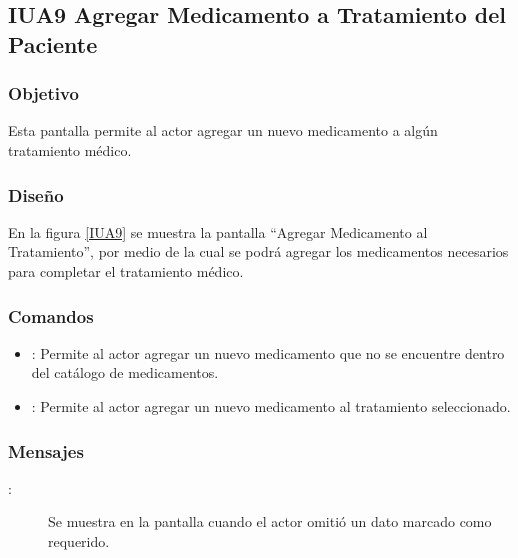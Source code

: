 \subsection{IUA9 Agregar Medicamento a Tratamiento del Paciente}
 
\subsubsection{Objetivo}

    Esta pantalla permite al actor agregar un nuevo medicamento a algún tratamiento médico.

\subsubsection{Diseño}

    En la figura \ref{IUA9} se muestra la pantalla ``Agregar Medicamento al Tratamiento'', por medio de la cual se podrá agregar los medicamentos necesarios para completar el tratamiento médico. \\


\subsubsection{Comandos}
\begin{itemize}
    \item {}: Permite al actor agregar un nuevo medicamento que no se encuentre dentro del catálogo de medicamentos.
    \item {}: Permite al actor agregar un nuevo medicamento al tratamiento seleccionado.
\end{itemize}

\subsubsection{Mensajes}

\begin{description}
    \item[:] Se muestra en la pantalla  cuando el actor omitió un dato marcado como requerido.
   
\end{description}
